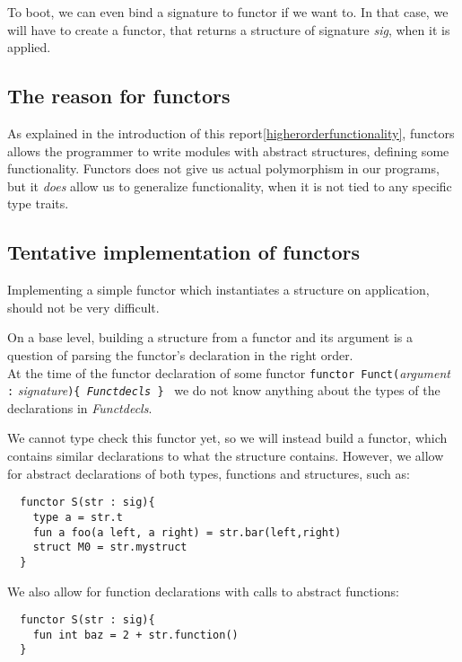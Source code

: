 To boot, we can even bind a signature to functor if we want to. In that case, we
will have to create a functor, that returns a structure of signature
\textit{sig}, when it is applied.

\subsection{The reason for functors}
\label{subsec:reasonfunctors}
As explained in the introduction of this report\ref{higherorderfunctionality},
functors allows the programmer to write modules with abstract structures,
defining some functionality.
Functors does not give us actual polymorphism in our programs, but it
\emph{does} allow us to generalize functionality, when it is not tied to any
specific type traits.

\subsection{Tentative implementation of functors}
\label{subsec:implementing_functors}
Implementing a simple functor which instantiates a structure on application,
should not be very difficult.

On a base level, building a structure from a functor and its argument is a
question of parsing the functor's declaration in the right order.\\
At the time of the functor declaration of some functor
\texttt{functor Funct(}\textit{argument} \texttt{:}
\textit{signature}\texttt{)\{ \textit{Functdecls} \}} \, we do not
know anything about the types of the declarations in \textit{Functdecls}.

We cannot type check this functor yet, so we will instead build a functor,
which contains similar declarations to what the structure contains.
However, we allow for abstract declarations of both types, functions and
structures, such as:
\begin{lstlisting}
  functor S(str : sig){
    type a = str.t
    fun a foo(a left, a right) = str.bar(left,right)
    struct M0 = str.mystruct
  }
\end{lstlisting}
We also allow for function declarations with calls to abstract functions:
\begin{lstlisting}
  functor S(str : sig){
    fun int baz = 2 + str.function()
  }
\end{lstlisting}

